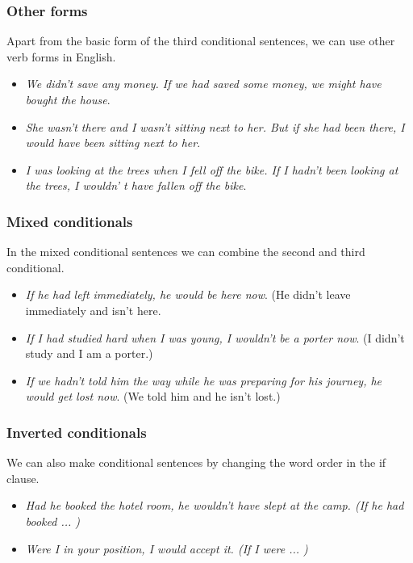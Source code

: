 \subsubsection{Other forms}

Apart from the basic form of the third conditional sentences, we can use other verb forms in English. 

\begin{itemize}

\item \textit{We didn't save any money. If we had saved some money, we might have bought the house}.
\item \textit{She wasn't there and I wasn't sitting next to her. But if she had been there, I would have been sitting next to her}.
\item \textit{I was looking at the trees when I fell off the bike. If I hadn't been looking at the trees, I wouldn' t have fallen off the bike}.

\end{itemize}

\subsubsection{Mixed conditionals}

In the mixed conditional sentences we can combine the second and third conditional. 

\begin{itemize}

\item \textit{If he had left immediately, he would be here now}. (He didn't leave immediately and isn't here.
\item \textit{If I had studied hard when I was young, I wouldn't be a porter now}. (I didn't study and I am a porter.)
\item \textit{If we hadn't told him the way while he was preparing for his journey, he would get lost now}. (We told him and he isn't lost.)

\end{itemize}

\subsubsection{Inverted conditionals}

We can also make conditional sentences by changing the word order in the if clause.

\begin{itemize}

\item \textit{Had he booked the hotel room, he wouldn't have slept at the camp. (If he had booked ... )}
\item \textit{Were I in your position, I would accept it. (If I were ... )}

\end{itemize}

